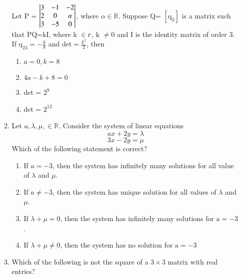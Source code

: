 \documentclass[journal,12pt,twocolumn]{IEEEtran}
\theoremstyle{remark}
\begin{document}
\begin{enumerate}
\begin{enumerate}
					Let P = 
						$\begin{vmatrix}							3 & -1 & -2\\
							2 & 0 & \alpha\\
							3 & -5 & 0
						\end{vmatrix}$,
					where $\alpha \in \mathbb{R}$. Suppose Q= $\mathrm{[q_{ij}]}$ is a matrix such that PQ=kI, where k $\in \mathbb{r}$, k $\neq 0$ and I is the identity matrix of order $3$. If $\mathrm{q_{23}} = -\frac{k}{8}$ and det$= \frac{k^2}{2}$, then
					\begin{enumerate}
						\item $a=0, k=8$
						\item $4a-k+8=0$
						\item det  = $2^9$
						\item det  = $2^{13}$
					\end{enumerate}
					\hfill {}
				\item
					Let $a, \lambda, \mu, \in \mathbb{R}$. Consider the system of linear equations $$ax+2y=\lambda$$ $$3x-2y=\mu$$ Which of the following statement is  correct?
					\begin{enumerate}
						\item If $a=-3$, then the system has infinitely many solutions for all value of $\lambda$ and $\mu$.
						\item If $a \neq -3$, then the system has unique solution for all values of $\lambda$ and $\mu$.
						\item If $\lambda + \mu = 0$, then the system has infinitely many solutions for $\mathrm{a} = -3$.
						\item If $\lambda + \mu \neq 0$, then the system has no solution for $\mathrm{a} = -3$
					\end{enumerate}
					\hfill {}
				\item 
					Which of the following is  not the square of a $3 \times 3$ matrix with real entries?
\end{enumerate}
\end{enumerate}
\end{document}
